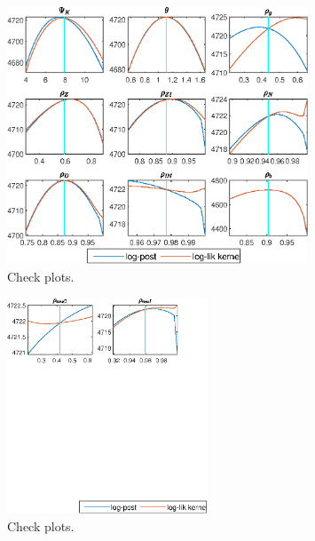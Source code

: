 \begin{figure}[H]
\centering 
\includegraphics[width=0.80\textwidth]{BRS_sectoral_artificial_data/graphs/BRS_sectoral_artificial_data_CheckPlots3}
\caption{Check plots.}\label{Fig:CheckPlots:3}
\end{figure}
 
\begin{figure}[H]
\centering 
\includegraphics[width=0.53\textwidth]{BRS_sectoral_artificial_data/graphs/BRS_sectoral_artificial_data_CheckPlots4}
\caption{Check plots.}\label{Fig:CheckPlots:4}
\end{figure}
 
